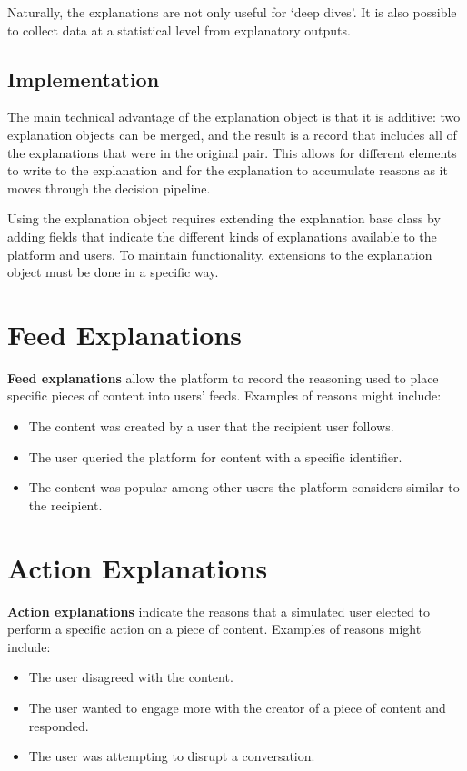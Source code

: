 Naturally, the explanations are not only useful for `deep dives'. It is also possible to collect data at a statistical level from explanatory outputs.

\subsection{Implementation}
The main technical advantage of the explanation object is that it is additive: two explanation objects can be merged, and the result is a record that includes all of the explanations that were in the original pair. This allows for different elements to write to the explanation and for the explanation to accumulate reasons as it moves through the decision pipeline.

Using the explanation object requires extending the explanation base class by adding fields that indicate the different kinds of explanations available to the platform and users. To maintain functionality, extensions to the explanation object must be done in a specific way.

\section{Feed Explanations} 
\textbf{Feed explanations} allow the platform to record the reasoning used to place specific pieces of content into users' feeds. Examples of reasons might include:
\begin{itemize}
\item The content was created by a user that the recipient user follows.
\item The user queried the platform for content with a specific identifier.
\item The content was popular among other users the platform considers similar to the recipient.
\end{itemize}

\section{Action Explanations}
\textbf{Action explanations} indicate the reasons that a simulated user elected to perform a specific action on a piece of content. Examples of reasons might include:
\begin{itemize}
\item The user disagreed with the content.
\item The user wanted to engage more with the creator of a piece of content and responded.
\item The user was attempting to disrupt a conversation.
\end{itemize}
  
